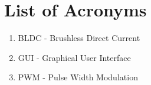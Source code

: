 \section{List of Acronyms}
  
\begin{enumerate} 
  \item BLDC - Brushless Direct Current 
  \item GUI - Graphical User Interface
  \item PWM - Pulse Width Modulation
\end{enumerate}

